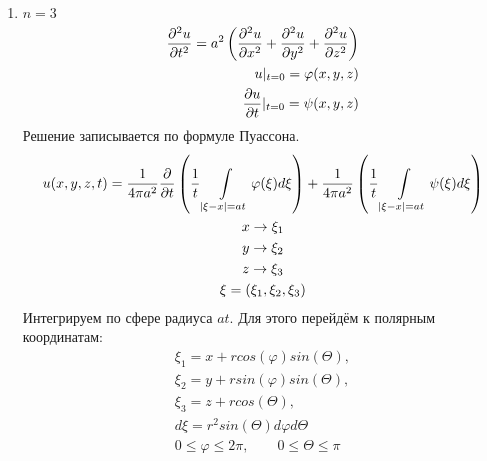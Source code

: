 \documentclass[../main.tex]{subfiles}
\begin{document}
\begin{enumerate}
	\item $n=3$
	      \begin{equation}
		      \label{eq:2.7.2_z}
		      \begin{split}
			      \frac{\partial ^2u}{\partial t^2} = a^2\left(\frac{\partial ^2u}{\partial x^2}+\frac{\partial ^2u}{\partial y^2}+\frac{\partial ^2u}{\partial z^2}\right)\\
			      u|_{t=0} = \varphi(x,y,z)\\
			      \frac{\partial u}{\partial t}|_{t=0} = \psi(x,y,z)
		      \end{split}
	      \end{equation}
	      Решение записывается по формуле Пуассона.
	      \begin{gather*}
		      u(x,y,z,t) = \frac{1}{4\pi a^2}\frac{\partial  }{\partial t}\left(
		      \frac{1}{t}\int\displaylimits_{|\xi-x|=at} \varphi(\xi)d\xi\right)
		      +
		      \frac{1}{4\pi a^2}\left(
		      \frac{1}{t}\int\displaylimits_{|\xi-x|=at} \psi(\xi)d\xi\right)\\
		      x \rightarrow \xi_1\\
		      y \rightarrow \xi_2\\
		      z \rightarrow \xi_3\\
		      \xi = (\xi_1,\xi_2, \xi_3)
	      \end{gather*}
	      Интегрируем по сфере радиуса $at$. Для этого перейдём к
	      полярным координатам:
	      \begin{gather*}
		      \xi_1 = x + r cos(\varphi) sin(\varTheta), \\
		      \xi_2 = y + r sin(\varphi) sin(\varTheta),\\
		      \xi_3 = z + r cos(\varTheta),\\
		      d\xi = r^2 sin(\varTheta) d\varphi d\varTheta \\
		      0 \leq \varphi \leq 2\pi, \qquad 0 \leq \varTheta \leq \pi
	      \end{gather*}
\end{enumerate}
\end{document}
